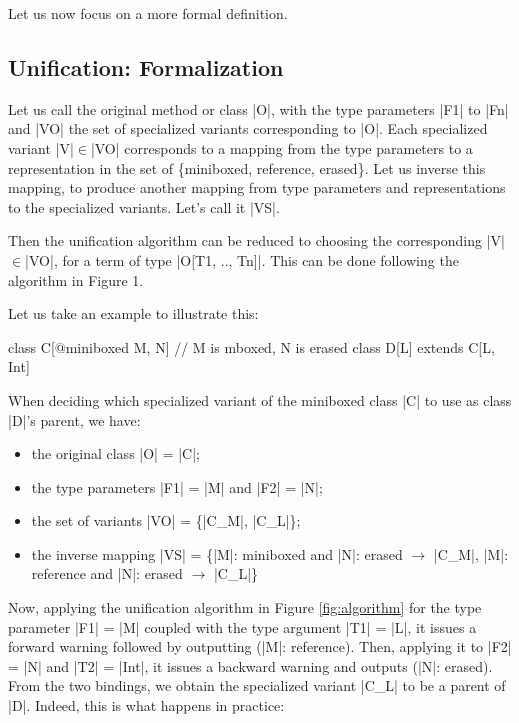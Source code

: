 Let us now focus on a more formal definition.

\subsection{Unification: Formalization}

Let us call the original method or class |O|, with the type parameters |F1| to |Fn| and |VO| the set of specialized variants corresponding to |O|. Each specialized variant |V|$\in$|VO| corresponds to a mapping from the type parameters to a representation in the set of \{miniboxed, reference, erased\}. Let us inverse this mapping, to produce another mapping from type parameters and representations to the specialized variants. Let's call it |VS|.

Then the unification algorithm can be reduced to choosing the corresponding |V|$\in$|VO|, for a term of type |O[T1, .., Tn]|. This can be done following the algorithm in Figure 1.

Let us take an example to illustrate this:

\begin{lstlisting-nobreak}
class C[@miniboxed M, N] // M is mboxed, N is erased
class D[L] extends C[L, Int]
\end{lstlisting-nobreak}

When deciding which specialized variant of the miniboxed class |C| to use as class |D|'s parent, we have:
\begin{itemize}
 \item the original class |O| = |C|;
 \item the type parameters |F1| = |M| and |F2| = |N|;
 \item the set of variants |VO| = \{|C_M|, |C_L|\};
 \item the inverse mapping |VS| = \{|M|: miniboxed and |N|: erased $\rightarrow$ |C_M|, |M|: reference and |N|: erased $\rightarrow$ |C_L|\}
\end{itemize}

Now, applying the unification algorithm in Figure \ref{fig:algorithm} for the type parameter |F1| = |M| coupled with the type argument |T1| = |L|, it issues a forward warning followed by outputting (|M|: reference). Then, applying it to |F2| = |N| and |T2| = |Int|, it issues a backward warning and outputs (|N|: erased). From the two bindings, we obtain the specialized variant |C_L| to be a parent of |D|. Indeed, this is what happens in practice:

